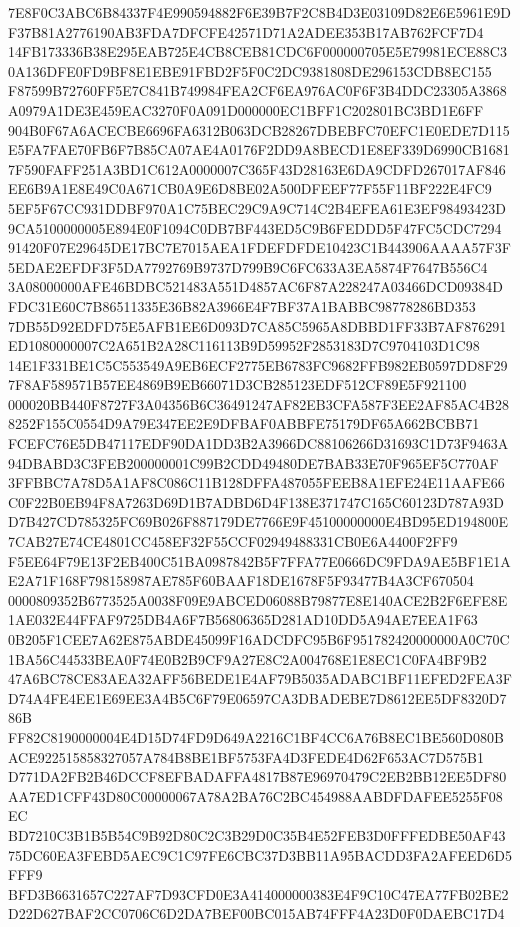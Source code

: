 \documentclass[UTF8,fontset=fandol,zihao=-4,a4paper]{ctexart}
\begin{document}
{{7E8F0C3ABC6B84337F4E990594882F6E39B7F2C8B4D3E03109D82E6E5961E9DF37B81A2776190AB3FDA7DFCFE42571D71A2ADEE353B17AB762FCF7D4
14FB173336B38E295EAB725E4CB8CEB81CDC6F000000705E5E79981ECE88C30A136DFE0FD9BF8E1EBE91FBD2F5F0C2DC9381808DE296153CDB8EC155
F87599B72760FF5E7C841B749984FEA2CF6EA976AC0F6F3B4DDC23305A3868A0979A1DE3E459EAC3270F0A091D000000EC1BFF1C202801BC3BD1E6FF
904B0F67A6ACECBE6696FA6312B063DCB28267DBEBFC70EFC1E0EDE7D115E5FA7FAE70FB6F7B85CA07AE4A0176F2DD9A8BECD1E8EF339D6990CB1681
7F590FAFF251A3BD1C612A0000007C365F43D28163E6DA9CDFD267017AF846EE6B9A1E8E49C0A671CB0A9E6D8BE02A500DFEEF77F55F11BF222E4FC9
5EF5F67CC931DDBF970A1C75BEC29C9A9C714C2B4EFEA61E3EF98493423D9CA5100000005E894E0F1094C0DB7BF443ED5C9B6FEDDD5F47FC5CDC7294
91420F07E29645DE17BC7E7015AEA1FDEFDFDE10423C1B443906AAAA57F3F5EDAE2EFDF3F5DA7792769B9737D799B9C6FC633A3EA5874F7647B556C4
3A08000000AFE46BDBC521483A551D4857AC6F87A228247A03466DCD09384DFDC31E60C7B86511335E36B82A3966E4F7BF37A1BABBC98778286BD353
7DB55D92EDFD75E5AFB1EE6D093D7CA85C5965A8DBBD1FF33B7AF876291ED1080000007C2A651B2A28C116113B9D59952F2853183D7C9704103D1C98
14E1F331BE1C5C553549A9EB6ECF2775EB6783FC9682FFB982EB0597DD8F297F8AF589571B57EE4869B9EB66071D3CB285123EDF512CF89E5F921100
000020BB440F8727F3A04356B6C36491247AF82EB3CFA587F3EE2AF85AC4B288252F155C0554D9A79E347EE2E9DFBAF0ABBFE75179DF65A662BCBB71
FCEFC76E5DB47117EDF90DA1DD3B2A3966DC88106266D31693C1D73F9463A94DBABD3C3FEB200000001C99B2CDD49480DE7BAB33E70F965EF5C770AF
3FFBBC7A78D5A1AF8C086C11B128DFFA487055FEEB8A1EFE24E11AAFE66C0F22B0EB94F8A7263D69D1B7ADBD6D4F138E371747C165C60123D787A93D
D7B427CD785325FC69B026F887179DE7766E9F45100000000E4BD95ED194800E7CAB27E74CE4801CC458EF32F55CCF02949488331CB0E6A4400F2FF9
F5EE64F79E13F2EB400C51BA0987842B5F7FFA77E0666DC9FDA9AE5BF1E1AE2A71F168F798158987AE785F60BAAF18DE1678F5F93477B4A3CF670504
0000809352B6773525A0038F09E9ABCED06088B79877E8E140ACE2B2F6EFE8E1AE032E44FFAF9725DB4A6F7B56806365D281AD10DD5A94AE7EEA1F63
0B205F1CEE7A62E875ABDE45099F16ADCDFC95B6F951782420000000A0C70C1BA56C44533BEA0F74E0B2B9CF9A27E8C2A004768E1E8EC1C0FA4BF9B2
47A6BC78CE83AEA32AFF56BEDE1E4AF79B5035ADABC1BF11EFED2FEA3FD74A4FE4EE1E69EE3A4B5C6F79E06597CA3DBADEBE7D8612EE5DF8320D786B
FF82C8190000004E4D15D74FD9D649A2216C1BF4CC6A76B8EC1BE560D080BACE922515858327057A784B8BE1BF5753FA4D3FEDE4D62F653AC7D575B1
D771DA2FB2B46DCCF8EFBADAFFA4817B87E96970479C2EB2BB12EE5DF80AA7ED1CFF43D80C00000067A78A2BA76C2BC454988AABDFDAFEE5255F08EC
BD7210C3B1B5B54C9B92D80C2C3B29D0C35B4E52FEB3D0FFFEDBE50AF4375DC60EA3FEBD5AEC9C1C97FE6CBC37D3BB11A95BACDD3FA2AFEED6D5FFF9
BFD3B6631657C227AF7D93CFD0E3A414000000383E4F9C10C47EA77FB02BE2D22D627BAF2CC0706C6D2DA7BEF00BC015AB74FFF4A23D0F0DAEBC17D4
}}
\end{document}
